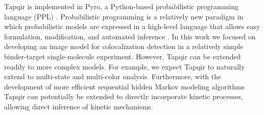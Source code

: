 Tapqir is implemented in Pyro, a Python-based probabilistic programming language (PPL) \cite{Bingham2019-qy}. Probabilistic programming is a relatively new paradigm in which probabilistic models are expressed in a high-level language that allows easy formulation, modification, and automated inference \cite{Van_de_Meent2018-mi}. In this work we focused on developing an image model for colocalization detection in a relatively simple binder-target single-molecule experiment. However, Tapqir can be extended readily to more complex models. For example, we expect Tapqir to naturally extend to multi-state and multi-color analysis. Furthermore, with the development of more efficient sequential hidden Markov modeling algorithms \cite{Sarkka2019-jw,Obermeyer2019-pp} Tapqir can potentially be extended to directly incorporate kinetic processes, allowing direct inference of kinetic mechanisms.



